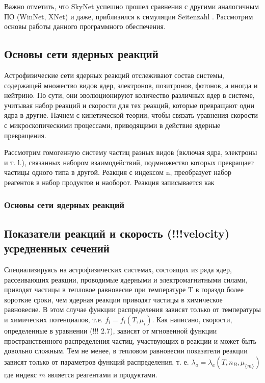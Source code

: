 \documentclass[%
master,    %
natbib,      %
subf,        %
href,        %
colorlinks,  %
]{disser}
\begin{document}
Важно отметить, что SkyNet успешно прошел сравнения с другими аналогичным ПО (WinNet, XNet) и даже, приблизился к симуляции Seitenzahl \cite{simulation}. Рассмотрим основы работы данного программного обеспечения.

\subsection{Основы сети ядерных реакций}

Астрофизические сети ядерных реакций отслеживают состав системы, содержащей множество видов ядер, электронов, позитронов, фотонов, а иногда и нейтрино. По сути, они эволюционируют количество различных ядер в системе, учитывая набор реакций и скорости для тех реакций, которые превращают одни ядра в другие. Начнем с кинетической теории, чтобы связать уравнения скорости с микроскопическими процессами, приводящими в действие ядерные превращения.

Рассмотрим гомогенную систему частиц разных видов (включая ядра, электроны и т. l.), связанных набором взаимодействий, подмножество которых превращает частицы одного типа в другой. Реакция с индексом n, преобразует набор реагентов в набор продуктов и наоборот. Реакция записывается как 


\subsubsection{Основы сети ядерных реакций}

\subsection{Показатели реакций и скорость (!!!velocity) усредненных сечений}
Специализируясь на астрофизических системах, состоящих из ряда ядер, рассеивающих реакции, проводимые ядерными и электромагнитными силами, приводят частицы в тепловое равновесие при температуре T в гораздо более короткие сроки, чем ядерная реакции приводят частицы в химическое равновесие. В этом случае функции распределения зависят только от температуры и химических потенциалов, т.е. $f_i = f_i(T, \mu_i)$. Как написано, скорости, определенные в уравнении (!!! 2.7), зависят от мгновенной функции пространственного распределения частиц, участвующих в реакции и может быть довольно сложным. Тем не менее, в тепловом равновесии показатели реакции зависят только от параметров функций распределения, т. е. $\lambda_a = \lambda_a(T, n_B, \mu_{\{m\}})$
где индекс $m$ является реагентами и продуктами. 
\end{document}

